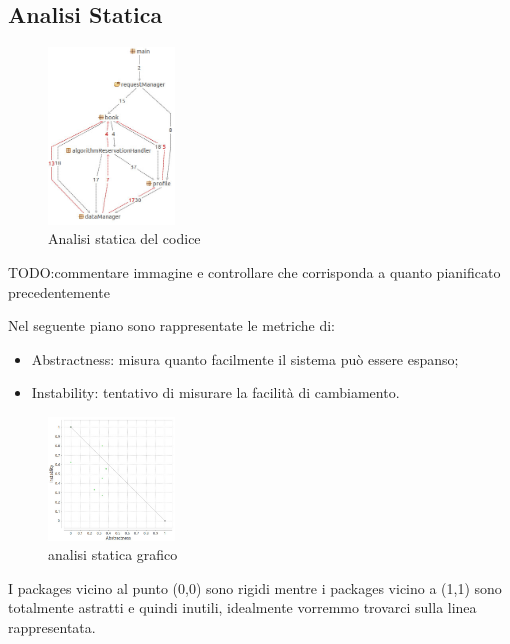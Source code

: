 	\subsection{Analisi Statica}
		\begin{figure}[h!]
			\centering
			\includegraphics[width=0.3\textwidth]{Immagini/analisi_statica_package.jpg}
			\caption{Analisi statica del codice}
			\label{fig:analisiStatica}
		\end{figure}
		TODO:commentare immagine e controllare che corrisponda a quanto pianificato precedentemente
		
		
		Nel seguente piano sono rappresentate le metriche di:
		\begin{itemize}
			\item Abstractness: misura quanto facilmente il sistema può essere espanso;
			\item Instability: tentativo di misurare la facilità di cambiamento. 
		\end{itemize}
\newpage
	\begin{figure}[h!]
		\centering
		\includegraphics[width=0.3\textwidth]{Immagini/analisi_statica_grafico1.jpg}
		\caption{analisi statica grafico}
		\label{fig:analisiStaticaGrafico}
	\end{figure}		
I packages vicino al punto (0,0) sono rigidi mentre i packages vicino a (1,1) sono totalmente astratti e quindi inutili, idealmente vorremmo trovarci sulla linea rappresentata.
	
	
	
	
	
	
	
